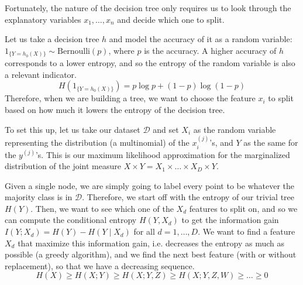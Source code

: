 \documentclass{article}
\begin{document}
    Fortunately, the nature of the decision tree only requires us to look through the explanatory variables $x_1, \ldots, x_n$ and decide which one to split. 

    Let us take a decision tree $h$ and model the accuracy of it as a random variable: $1_{\{Y = h_0 (X)\}} \sim \mathrm{Bernoulli}(p)$, where $p$ is the accuracy. A higher accuracy of $h$ corresponds to a lower entropy, and so the entropy of the random variable is also a relevant indicator. 
    \[H(1_{\{Y = h_0 (X)\}}) = p \log{p} + (1 - p) \log(1 - p)\]
    Therefore, when we are building a tree, we want to choose the feature $x_i$ to split based on how much it lowers the entropy of the decision tree. 

    To set this up, let us take our dataset $\mathcal{D}$ and set $X_i$ as the random variable representing the distribution (a multinomial) of the $x_i^{(j)}$'s, and $Y$ as the same for the $y^{(j)}$'s. This is our maximum likelihood approximation for the marginalized distribution of the joint measure $X \times Y = X_1 \times \ldots \times X_D \times Y$. 

    Given a single node, we are simply going to label every point to be whatever the majority class is in $\mathcal{D}$. Therefore, we start off with the entropy of our trivial tree $H(Y)$. Then, we want to see which one of the $X_d$ features to split on, and so we can compute the conditional entropy $H(Y, X_d)$ to get the information gain $I(Y; X_d) = H(Y) - H(Y \mid X_d)$ for all $d = 1, \ldots, D$. We want to find a feature $X_d$ that maximize this information gain, i.e. decreases the entropy as much as possible (a greedy algorithm), and we find the next best feature (with or without replacement), so that we have a decreasing sequence. 
    \[H(X) \geq H(X ; Y) \geq H(X ; Y, Z) \geq H(X ; Y, Z, W) \geq \ldots \geq 0\]
\end{document}
